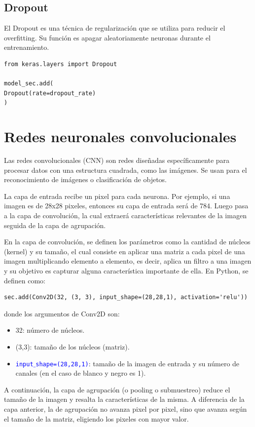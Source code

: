 \documentclass[a4paper, 12pt]{book}
\begin{document}
\subsection{Dropout}
El Dropout es una técnica de regularización que se utiliza para reducir el overfitting. Su función es apagar aleatoriamente neuronas durante el entrenamiento.
\begin{verbatim}
from keras.layers import Dropout

model_sec.add(
Dropout(rate=dropout_rate)
)
\end{verbatim}

\section{Redes neuronales convolucionales}
Las redes convolucionales (CNN) son redes diseñadas específicamente para procesar datos con una estructura cuadrada, como las imágenes. Se usan para el reconocimiento de imágenes o clasificación de objetos.

La capa de entrada recibe un pixel para cada neurona. Por ejemplo, si una imagen es de 28x28 pixeles, entonces su capa de entrada será de 784. Luego pasa a la capa de convolución, la cual extraerá características relevantes de la imagen seguida de la capa de agrupación.


En la capa de convolución, se definen los parámetros como la cantidad de núcleos (kernel) y su tamaño, el cual consiste en aplicar una matriz a cada pixel de una imagen multiplicando elemento a elemento, es decir, aplica un filtro a una imagen y su objetivo es capturar alguna característica importante de ella.
En Python, se definen como:
\begin{verbatim}
sec.add(Conv2D(32, (3, 3), input_shape=(28,28,1), activation='relu'))
\end{verbatim}
donde los argumentos de Conv2D son:
\begin{itemize}
	\item 32: número de núcleos.
	\item (3,3): tamaño de los núcleos (matriz).
	\item \texttt{\textcolor{blue}{input$\_$shape=(28,28,1)}}: tamaño de la imagen de entrada y su número de canales (en el caso de blanco y negro es 1).
\end{itemize}
A continuación, la capa de agrupación (o pooling o submuestreo) reduce el tamaño de la imagen y resalta la características de la misma. A diferencia de la capa anterior, la de agrupación no avanza pixel por pixel, sino que avanza según el tamaño de la matriz, eligiendo los pixeles con mayor valor.
\end{document}
